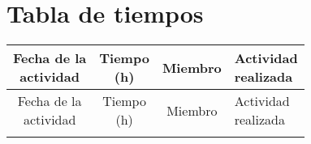 \documentclass[12pt]{article}
\begin{document}
\section{Tabla de tiempos}

\begin{longtable}{|c|c|c|p{7.5cm}|}
\hline
\makecell{Fecha de la \\ actividad} 
& \makecell{Tiempo \\ (h)} 
& Miembro 
& \makecell{Actividad \\ realizada} \\
\hline
\endfirsthead

\hline
\makecell{Fecha de la \\ actividad} 
& \makecell{Tiempo \\ (h)} 
& Miembro 
& \makecell{Actividad \\ realizada} \\
\hline
\endhead

\hline
\endfoot


\end{longtable}
\end{document}
